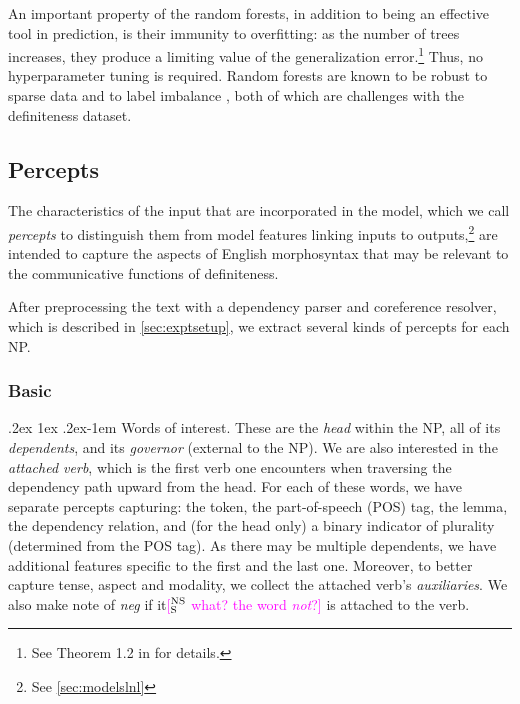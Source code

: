 \documentclass[11pt,letterpaper]{article}
\makeatletter
\newcommand{\ensuretext}[1]{#1}
\newcommand{\nssmarker}{\ensuretext{\textcolor{magenta}{\ensuremath{^{\textsc{NS}}_{\textsc{S}}}}}}
\newcommand{\arkcomment}[3]{\ensuretext{\textcolor{#3}{[#1 #2]}}}
\newcommand{\nss}[1]{\arkcomment{\nssmarker}{#1}{magenta}}
\renewcommand{\paragraph}{%
  \@startsection{paragraph}{4}%
  {\z@}{.2ex \@plus 1ex \@minus .2ex}{-1em}%
  {\normalfont\normalsize\bfseries}%
}
\makeatother
\begin{document}
An important property of the random forests, in addition to being an effective tool in prediction, is their immunity to overfitting: 
as the number of trees increases, they produce a limiting value of the generalization error.\footnote{See Theorem 1.2 in \cite{Breiman:2001} for details.} 
Thus, no hyperparameter tuning is required. %
Random forests are known to be robust to sparse data and to label imbalance \citep{chen}, both of which are challenges with the definiteness dataset.

\subsection{Percepts}\label{sec:feats}

The characteristics of the input that are incorporated in the model, which we call \emph{percepts} 
to distinguish them from model features linking inputs to outputs,\footnote{See \cref{sec:modelslnl}} 
are intended to capture the aspects of English morphosyntax that may be relevant 
to the communicative functions of definiteness.

After preprocessing the text with a dependency parser and coreference resolver, which is described in \cref{sec:exptsetup}, 
we extract several kinds of percepts for each NP.

\subsubsection{Basic}

\paragraph{Words of interest.} 
These are the \emph{head} within the NP, all of its \emph{dependents}, and its \emph{governor} (external to the NP). 
We are also interested in the \emph{attached verb}, which is the first verb one encounters when traversing the dependency path upward from the head. 
For each of these words, we have separate percepts capturing: the token, the part-of-speech (POS) tag, the lemma, 
the dependency relation,
and (for the head only) a binary indicator of plurality (determined from the POS tag).
As there may be multiple dependents, we have additional features specific to the first and the last one. 
Moreover, to better capture tense, aspect and modality, we collect the attached verb's \emph{auxiliaries}. 
We also make note of \emph{neg} if it\nss{what? the word \emph{not}?} is attached to the verb.
    
\end{document}
